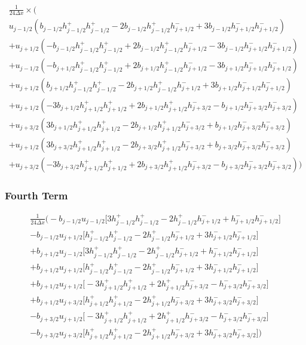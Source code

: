 \documentclass[12pt]{article}
\begin{document}
  \begin{multline}
  \frac{1}{24\Delta x} \times \bigg(\\u_{j-1/2} \left(b_{j-1/2} h^+_{j-1/2}h^+_{j-1/2} - 2b_{j-1/2}h^+_{j-1/2}h^-_{j+1/2} +3 b_{j-1/2}h^-_{j+1/2}h^-_{j+1/2} \right) \\+u_{j+1/2}\left(- b_{j-1/2}h^+_{j-1/2}h^+_{j-1/2} + 2b_{j-1/2}h^+_{j-1/2}h^-_{j+1/2} - 3b_{j-1/2}h^-_{j+1/2}h^-_{j+1/2} \right) \\ +u_{j-1/2} \left(-b_{j+1/2} h^+_{j-1/2}h^+_{j-1/2}  + 2b_{j+1/2} h^+_{j-1/2}h^-_{j+1/2} -3 b_{j+1/2} h^-_{j+1/2}h^-_{j+1/2} \right)\\+ u_{j+1/2}\left( b_{j+1/2}h^+_{j-1/2}h^+_{j-1/2} - 2b_{j+1/2}h^+_{j-1/2}h^-_{j+1/2}+ 3b_{j+1/2}h^-_{j+1/2}h^-_{j+1/2} \right) \\
  + u_{j+1/2} \left(-3b_{j+1/2} h^+_{j+1/2}h^+_{j+1/2}+ 2b_{j+1/2} h^+_{j+1/2}h^-_{j+3/2} - b_{j+1/2} h^-_{j+3/2}h^-_{j+3/2}  \right)\\ + u_{j+3/2}\left(3b_{j+1/2}h^+_{j+1/2}h^+_{j+1/2} -2b_{j+1/2}h^+_{j+1/2}h^-_{j+3/2}  + b_{j+1/2}h^-_{j+3/2}h^-_{j+3/2} \right) \\+ u_{j+1/2}\left(3b_{j+3/2} h^+_{j+1/2}h^+_{j+1/2} - 2b_{j+3/2} h^+_{j+1/2}h^-_{j+3/2} + b_{j+3/2} h^-_{j+3/2}h^-_{j+3/2}\right) \\+u_{j+3/2}\left(-3b_{j+3/2} h^+_{j+1/2}h^+_{j+1/2} + 2b_{j+3/2} h^+_{j+1/2}h^-_{j+3/2} - b_{j+3/2} h^-_{j+3/2}h^-_{j+3/2} \right) \bigg)
  \end{multline}

 \subsubsection{Fourth Term}
 
 \begin{multline} 
\frac{1}{24\Delta x}  \bigg( -b_{j-1/2}u_{j-1/2}\bigg[ 3h^+_{j-1/2}h^+_{j-1/2} - 2h^+_{j-1/2}h^-_{j+1/2}  + h^-_{j+1/2}h^-_{j+1/2} \bigg] \\- b_{j-1/2}u_{j+1/2} \bigg[ h^+_{j-1/2}h^+_{j-1/2}  - 2h^+_{j-1/2}h^-_{j+1/2}  + 3h^-_{j+1/2}h^-_{j+1/2} \bigg] \\+ b_{j+1/2} u_{j-1/2} \bigg[ 3h^+_{j-1/2}h^+_{j-1/2} - 2h^+_{j-1/2}h^-_{j+1/2}  + h^-_{j+1/2}h^-_{j+1/2} \bigg] \\+ b_{j+1/2}u_{j+1/2}  \bigg[ h^+_{j-1/2}h^+_{j-1/2}  - 2h^+_{j-1/2}h^-_{j+1/2}  + 3h^-_{j+1/2}h^-_{j+1/2} \bigg] \\ + b_{j+1/2}u_{j+1/2} \bigg[-3h^+_{j+1/2}h^+_{j+1/2} + 2h^+_{j+1/2}h^-_{j+3/2}  - h^-_{j+3/2}h^-_{j+3/2} \bigg]\\ + b_{j+1/2}u_{j+3/2}\bigg[h^+_{j+1/2}h^+_{j+1/2} - 2h^+_{j+1/2}h^-_{j+3/2} + 3h^-_{j+3/2}h^-_{j+3/2}\bigg] \\
 -  b_{j+3/2} u_{j+1/2}\bigg[-3h^+_{j+1/2}h^+_{j+1/2} + 2h^+_{j+1/2}h^-_{j+3/2}  - h^-_{j+3/2}h^-_{j+3/2} \bigg] \\
 -  b_{j+3/2}u_{j+3/2} \bigg[h^+_{j+1/2}h^+_{j+1/2} - 2h^+_{j+1/2}h^-_{j+3/2} + 3h^-_{j+3/2}h^-_{j+3/2}\bigg]\bigg)
 \end{multline}
 
\end{document}
